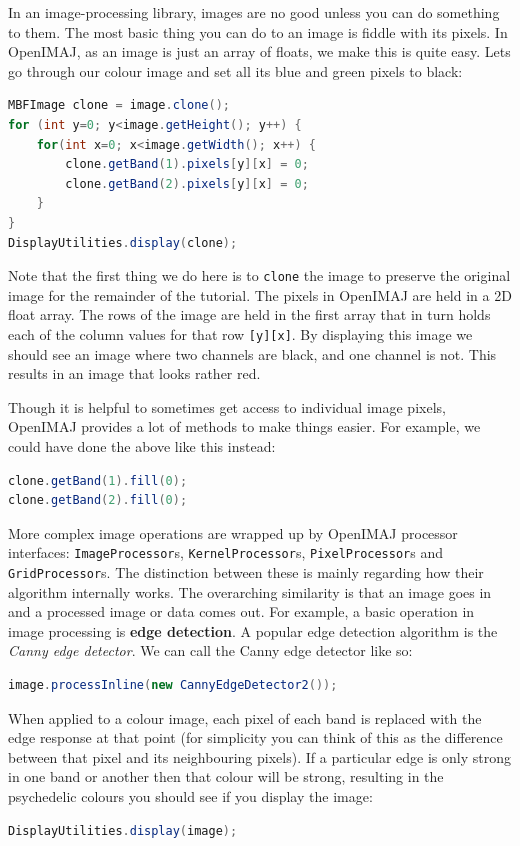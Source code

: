 \documentclass[10pt,a4paper,twoside,extrafontsizes]{memoir}
\begin{document}
In an image-processing library, images are no good unless you can do something to them. The most basic 
thing you can do to an image is fiddle with its pixels. In OpenIMAJ, as an image is just an array of 
floats, we make this is quite easy. Lets go through our colour image and set all its blue and green 
pixels to black:
\begin{lstlisting}[language=java]
MBFImage clone = image.clone();
for (int y=0; y<image.getHeight(); y++) {
    for(int x=0; x<image.getWidth(); x++) {
        clone.getBand(1).pixels[y][x] = 0;
        clone.getBand(2).pixels[y][x] = 0;
    }
}
DisplayUtilities.display(clone);
\end{lstlisting}
Note that the first thing we do here is to \verb+clone+ the image to preserve the original image
for the remainder of the tutorial. The pixels in OpenIMAJ are held in a 2D float array. The rows 
of the image are held in the first array that in turn holds each of the column values for that 
row \verb+[y][x]+. By displaying this image we should see an image where two channels are black, 
and one channel is not. This results in an image that looks rather red.

Though it is helpful to sometimes get access to individual image pixels, OpenIMAJ provides a lot 
of methods to make things easier. For example, we could have done the above like this instead:
\begin{lstlisting}[language=java]
clone.getBand(1).fill(0);
clone.getBand(2).fill(0);
\end{lstlisting}

More complex image operations are wrapped up by OpenIMAJ processor interfaces: \verb+ImageProcessor+s, \verb+KernelProcessor+s,
\verb+PixelProcessor+s and \verb+GridProcessor+s. The distinction between these is mainly 
regarding how their algorithm internally works. The overarching similarity is that an image goes 
in and a processed image or data comes out. For example, a basic operation in image processing 
is \textbf{edge detection}. A popular edge detection algorithm is the \emph{Canny edge detector}. 
We can call the Canny edge detector like so:
\begin{lstlisting}[language=java]
image.processInline(new CannyEdgeDetector2());
\end{lstlisting}
When applied to a colour image, each pixel of each band is replaced with the edge response at 
that point (for simplicity you can think of this as the difference between that pixel and its 
neighbouring pixels). If a particular edge is only strong in one band or another then that 
colour will be strong, resulting in the psychedelic colours you should see if you display 
the image:
\begin{lstlisting}[language=java]
DisplayUtilities.display(image);
\end{lstlisting}
\end{document}
